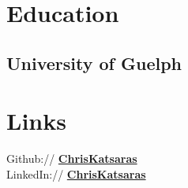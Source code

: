 \documentclass[letterpaper]{deedy-resume} %
\begin{document}
\begin{minipage}[t]{0.33\textwidth}
\section{Education} 

\subsection{University of Guelph}


\sectionspace %


\sectionspace %


\section{Links} 

Github:// \href{https://github.com/ChrisKatsaras}{\bf ChrisKatsaras} \\
LinkedIn:// \href{https://www.linkedin.com/in/christopher-katsaras-0a326211a?trk=hp-identity-photo}{\bf ChrisKatsaras} \\
\sectionspace %



\end{minipage} %
\hfill
%
%
\end{document}
